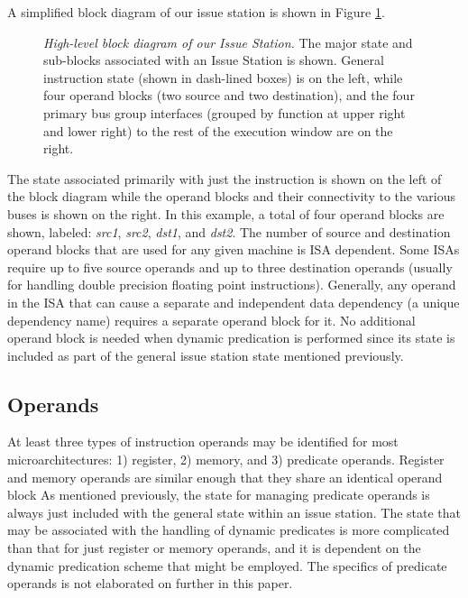 \documentclass[10pt,dvips]{article}
\begin{document}
A simplified block diagram of our issue station is shown in 
Figure \ref{fig:issuestation}.
%
\begin{figure}
\centering
\scriptsize {
}
\caption{{\em High-level block diagram of our Issue Station.} 
The major state and sub-blocks associated with an Issue Station is shown.
General instruction state (shown in dash-lined boxes) is
on the left, while
four operand blocks (two source and two destination),
and the four primary bus group interfaces (grouped by function at
upper right and lower right) to the rest of the
execution window are on the right.}
\label{fig:issuestation}
\end{figure}
%
The state associated primarily with just the instruction is
shown on the left of the block diagram while the operand blocks
and their connectivity to the various buses is shown on the
right.  
In this example, a total of four operand blocks are shown, labeled:
\textit{src1}, 
\textit{src2}, 
\textit{dst1}, 
and \textit{dst2}.
The number of source and destination operand blocks that are
used for any given machine is ISA dependent.
Some ISAs require up to five source operands and up to three destination
operands (usually for handling double precision floating point 
instructions).
Generally, any operand in the ISA that can cause a separate
and independent data dependency (a unique dependency name)
requires a separate operand block for it.
No additional operand block is needed when dynamic predication
is performed since its state is included as
part of the general issue station state mentioned previously.
%
%
\subsection{Operands}
%
At least three types of instruction operands may be identified
for most microarchitectures: 
1) register, 2) memory, and 3) predicate operands.
Register and memory operands are similar enough that
they share an identical operand block
As mentioned previously, the state for managing predicate
operands is always just included with the general state within
an issue station.
The state that may be associated with the handling of
dynamic predicates is more complicated than that for
just register or memory operands, and it is dependent
on the dynamic predication scheme that might be employed.
The specifics of predicate operands is not elaborated on
further in this paper.
\end{document}
